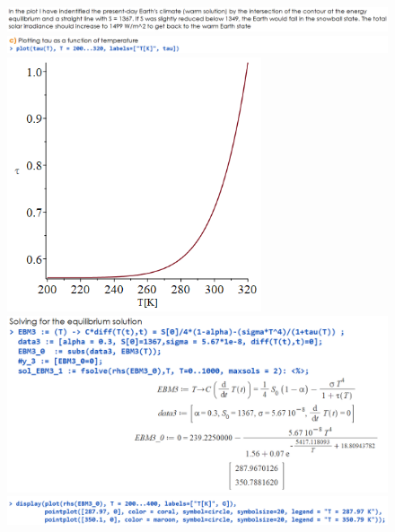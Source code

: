 \documentclass[11pt,a4paper]{article}
\begin{document}
\begin{figure}[H]
	\centering
	\includegraphics[width=150mm]{images/es2_5.PNG}
	
	\smallskip
	
	\includegraphics[width=150mm]{images/es2_6.PNG}
	
	\smallskip
	
	\includegraphics[width=75mm]{images/plot4.PNG}
	
	\bigskip
	
	\includegraphics[width=150mm]{images/es2_7.PNG}
	
	\smallskip
	
	\includegraphics[width=150mm]{images/es2_8.PNG}
	
	\smallskip
	

\end{figure}
\end{document}
